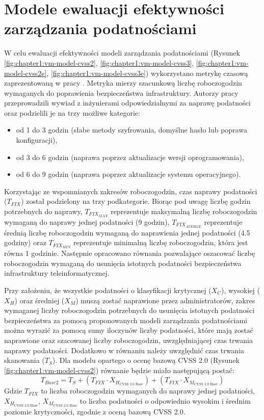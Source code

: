 \section{Modele ewaluacji efektywności zarządzania podatnościami}
\label{sec:modele-ewaluacji-efektywnosci}
W celu ewaluacji efektywności modeli zarządzania podatnościami (Rysunek \ref{fig:chapter1:vm-model-cvss2}, \ref{fig:chapter1:vm-model-cvss3}, \ref{fig:chapter1:vm-model-cvss2e}, \ref{fig:chapter1:vm-model-cvss3e}) wykorzystano metrykę czasową zaprezentowaną w pracy \cite{farris2018vulcon}. Metryka mierzy szacunkową liczbę roboczogodzin wymaganych do poprawienia bezpieczeństwa infrastruktury. Autorzy pracy \cite{farris2018vulcon} przeprowadzili wywiad z inżynierami odpowiedzialnymi za naprawę podatności oraz podzielili je na trzy możliwe kategorie:
\begin{itemize}
    \item od 1 do 3 godzin (słabe metody szyfrowania, domyślne hasło lub poprawa konfiguracji),
    \item od 3 do 6 godzin (naprawa poprzez aktualizacje wersji oprogramowania),
    \item od 6 do 9 godzin (naprawa poprzez aktualizacje systemu operacyjnego).
\end{itemize}

Korzystając ze wspomnianych zakresów roboczogodzin, czas naprawy podatności ($T_{FIX}$) został podzielony na trzy podkategorie. Biorąc pod uwagę liczbę godzin potrzebnych do naprawy, $T_{FIX_{MAX}}$ reprezentuje maksymalną liczbę roboczogodzin wymaganą do naprawy jednej podatności (9 godzin), $T_{FIX_{AVERGE}}$ reprezentuje średnią liczbę roboczogodzin wymaganą do naprawienia jednej podatności (4.5 godziny) oraz $T_{FIX_{MIN}}$ reprezentuje minimalną liczbę roboczogodzin, która jest równa 1 godzinie. Następnie opracowano równania pozwalające oszacować liczbę roboczogodzin wymaganą do usunięcia istotnych podatności bezpieczeństwa infrastruktury teleinformatycznej. 

\bigbreak
Przy założeniu, że wszystkie podatności o klasyfikacji krytycznej ($X_C$), wysokiej ($X_H$) oraz średniej ($X_M$) muszą zostać naprawione przez administratorów, zakres wymaganej liczby roboczogodzin potrzebnych do usunięcia istotnych podatności bezpieczeństwa za pomocą proponowanych modeli zarządzania podatnościami można wyrazić za pomocą sumy iloczynów liczby podatności, które mają zostać naprawione oraz szacowanej liczby roboczogodzin, uwzględniającej czas trwania naprawy podatności. Dodatkowo w równaniu należy uwzględnić czas trwania skanowania ($T_S$). Dla modelu opartego o ocenę bazową CVSS 2.0 (Rysunek \ref{fig:chapter1:vm-model-cvss2}) równanie będzie miało następującą postać:
\begin{equation}
\label{eq:cvss2}
T_{Base2} = T_S + (T_{FIX} \cdot X_{H_\text{CVSS 2.0 Base}}) + (T_{FIX} \cdot X_{M_\text{CVSS 2.0 Base}})
\end{equation}
Gdzie $T_{FIX}$ to liczba roboczogodzin wymaganych do naprawy jednej podatności, $X_{H_\text{CVSS 2.0 Base}}$, $X_{M_\text{CVSS 2.0 Base}}$ to liczba podatności o odpowiednio wysokim i średnim poziomie krytyczności, zgodnie z oceną bazową CVSS 2.0.

